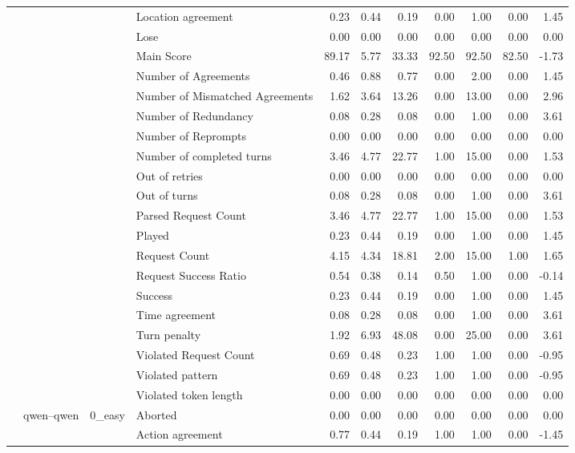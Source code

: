 \begin{tabular}{llllrrrrrrr}
 &  &  & Location agreement & 0.23 & 0.44 & 0.19 & 0.00 & 1.00 & 0.00 & 1.45 \\
 &  &  & Lose & 0.00 & 0.00 & 0.00 & 0.00 & 0.00 & 0.00 & 0.00 \\
 &  &  & Main Score & 89.17 & 5.77 & 33.33 & 92.50 & 92.50 & 82.50 & -1.73 \\
 &  &  & Number of Agreements & 0.46 & 0.88 & 0.77 & 0.00 & 2.00 & 0.00 & 1.45 \\
 &  &  & Number of Mismatched Agreements & 1.62 & 3.64 & 13.26 & 0.00 & 13.00 & 0.00 & 2.96 \\
 &  &  & Number of Redundancy & 0.08 & 0.28 & 0.08 & 0.00 & 1.00 & 0.00 & 3.61 \\
 &  &  & Number of Reprompts & 0.00 & 0.00 & 0.00 & 0.00 & 0.00 & 0.00 & 0.00 \\
 &  &  & Number of completed turns & 3.46 & 4.77 & 22.77 & 1.00 & 15.00 & 0.00 & 1.53 \\
 &  &  & Out of retries & 0.00 & 0.00 & 0.00 & 0.00 & 0.00 & 0.00 & 0.00 \\
 &  &  & Out of turns & 0.08 & 0.28 & 0.08 & 0.00 & 1.00 & 0.00 & 3.61 \\
 &  &  & Parsed Request Count & 3.46 & 4.77 & 22.77 & 1.00 & 15.00 & 0.00 & 1.53 \\
 &  &  & Played & 0.23 & 0.44 & 0.19 & 0.00 & 1.00 & 0.00 & 1.45 \\
 &  &  & Request Count & 4.15 & 4.34 & 18.81 & 2.00 & 15.00 & 1.00 & 1.65 \\
 &  &  & Request Success Ratio & 0.54 & 0.38 & 0.14 & 0.50 & 1.00 & 0.00 & -0.14 \\
 &  &  & Success & 0.23 & 0.44 & 0.19 & 0.00 & 1.00 & 0.00 & 1.45 \\
 &  &  & Time agreement & 0.08 & 0.28 & 0.08 & 0.00 & 1.00 & 0.00 & 3.61 \\
 &  &  & Turn penalty & 1.92 & 6.93 & 48.08 & 0.00 & 25.00 & 0.00 & 3.61 \\
 &  &  & Violated Request Count & 0.69 & 0.48 & 0.23 & 1.00 & 1.00 & 0.00 & -0.95 \\
 &  &  & Violated pattern & 0.69 & 0.48 & 0.23 & 1.00 & 1.00 & 0.00 & -0.95 \\
 &  &  & Violated token length & 0.00 & 0.00 & 0.00 & 0.00 & 0.00 & 0.00 & 0.00 \\
\cline{2-11} \cline{3-11}
 & \multirow[t]{216}{*}{qwen--qwen} & \multirow[t]{27}{*}{0_easy} & Aborted & 0.00 & 0.00 & 0.00 & 0.00 & 0.00 & 0.00 & 0.00 \\
 &  &  & Action agreement & 0.77 & 0.44 & 0.19 & 1.00 & 1.00 & 0.00 & -1.45 \\

\end{tabular}
